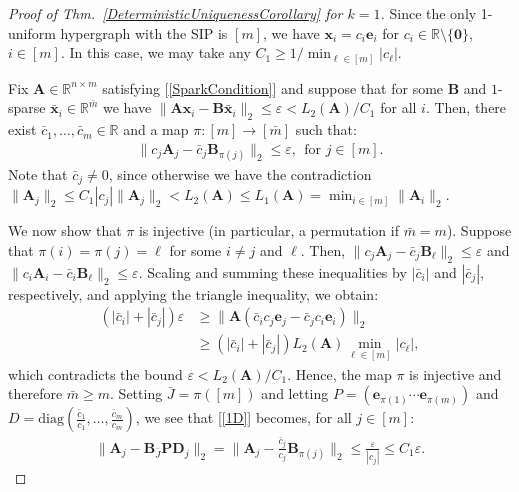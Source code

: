\documentclass[9pt,twocolumn]{pnas-new}
\renewcommand{\eqref}[1]{\textnormal{[\ref{#1}]}}
\begin{document}
\begin{proof}[Proof of Thm.~\ref{DeterministicUniquenessCorollary} for $k=1$]
Since the only 1-uniform hypergraph with the SIP is $[m]$, we have $\mathbf{x}_i = c_i \mathbf{e}_i$ for $c_i \in \mathbb{R} \setminus \{\mathbf{0}\}$, $i \in [m]$. In this case, we may take any $C_1 \geq 1/ \min_{\ell \in [m]} |c_{\ell}|$. 

Fix $\mathbf{A} \in \mathbb{R}^{n \times m}$ satisfying \eqref{SparkCondition} and suppose that for some $\mathbf{B}$ and $1$-sparse $\mathbf{\bar x}_i \in \mathbb{R}^{\bar m}$ we have  $\|\mathbf{A}\mathbf{x}_i - \mathbf{B}\mathbf{\bar x}_i\|_2 \leq \varepsilon < L_2(\mathbf{A}) / C_1$ for all $i$. Then, there exist $\bar{c}_1, \ldots, \bar{c}_m \in \mathbb{R}$ and a map $\pi: [m] \to [\bar m]$ such that:
\begin{align}\label{1D}
\|c_j\mathbf{A}_j - \bar{c}_j\mathbf{B}_{\pi(j)}\|_2 \leq \varepsilon,\ \ \text{for $j \in [m]$}.
\end{align} 
Note that $\bar{c}_j \neq 0$, since otherwise we have the contradiction $\|\mathbf{A}_j \|_2 \leq C_1 |c_j| \|\mathbf{A}_j \|_2  < L_2(\mathbf{A}) \leq L_1(\mathbf{A}) = \min_{i \in [m]} \|\mathbf{A}_i\|_2$. %

We  now show that $\pi$ is injective (in particular, a permutation if $\bar m = m$). Suppose that $\pi(i) = \pi(j) = \ell$ for some $i \neq j$ and $\ell$. Then, $\|c_{j}\mathbf{A}_{j} - \bar{c}_{j}\mathbf{B}_{\ell}\|_2 \leq \varepsilon$ and $\|c_{i}\mathbf{A}_{i} - \bar{c}_{i} \mathbf{B}_{\ell}\|_2  \leq \varepsilon$. Scaling and summing these inequalities by $|\bar{c}_{i}|$ and $|\bar{c}_{j}|$, respectively, and applying the triangle inequality, we obtain:
\begin{align*}
(|\bar{c}_{i}| + |\bar{c}_{j}|) \varepsilon
&\geq\|\mathbf{A}(\bar{c}_{i}c_{j} \mathbf{e}_{j} - \bar{c}_{j}c_{i}\mathbf{e}_{i})\|_2 \nonumber \\ 
&\geq  \left( |\bar{c}_{i}| + |\bar{c}_{j}| \right) L_2(\mathbf{A}) \min_{\ell \in [m]} |c_\ell |,
\end{align*}
which contradicts the bound $\varepsilon < L_2(\mathbf{A})/C_1$. Hence, the map $\pi$ is injective and therefore $\bar m \geq m$. Setting $\bar J = \pi([m])$ and letting $P = \left( \mathbf{e}_{\pi(1)} \cdots \mathbf{e}_{\pi(m)}\right)$ and $D = \text{diag}(\frac{\bar{c}_1}{c_1},\ldots,\frac{\bar{c}_m}{c_m})$, we see that \eqref{1D} becomes, for all $j \in [m]$:
\begin{align*}
\|\mathbf{A}_j - \mathbf{B}_{\bar J}\mathbf{PD}_j\|_2 
= \|\mathbf{A}_j - \frac{\bar{c}_j}{c_j}\mathbf{B}_{\pi(j)}\|_2 
\leq \frac{\varepsilon}{|c_j|} 
\leq C_1\varepsilon.
\end{align*}
\end{proof}
\end{document}
